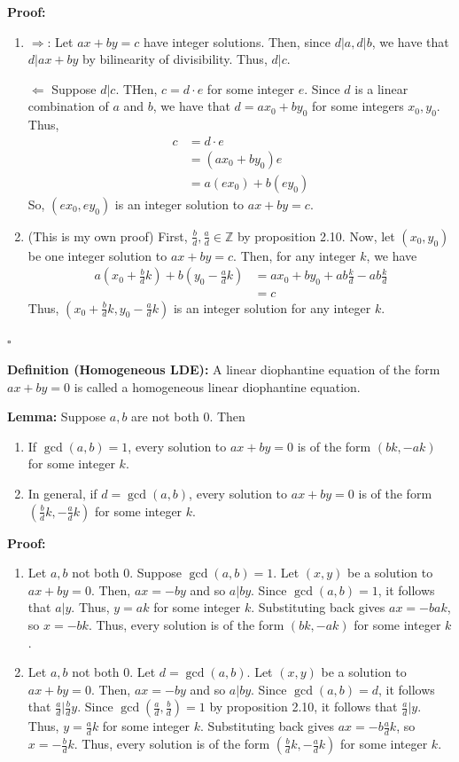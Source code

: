 \documentclass{article}
\newcommand*{\qed}{\hfill$\square$}%
\newcommand*{\zz}{\mathbb{Z}}%
\begin{document}
\textbf{Proof:} \begin{enumerate}[(1)]
    \item $\Rightarrow$: Let $ax+by=c$ have integer solutions. Then, since $d|a,d|b$, we have that $d|ax+by$ by bilinearity of divisibility. Thus, $d|c$.
    
    $\Leftarrow$ Suppose $d|c$. THen, $c=d\cdot e$ for some integer $e$. Since $d$ is a linear combination of $a$ and $b$, we have that $d = ax_0 + by_0$ for some integers $x_0,y_0$. Thus, \begin{align*}
        c &= d\cdot e \\
          &= (ax_0 + by_0)e \\
          &= a(ex_0) + b(ey_0)
    \end{align*}
    So, $(ex_0, ey_0)$ is an integer solution to $ax+by=c$.
    \item (This is my own proof) First, $\frac{b}{d}, \frac{a}{d}\in \zz$ by proposition 2.10. Now, let $(x_0,y_0)$ be one integer solution to $ax+by=c$. Then, for any integer $k$, we have \begin{align*}
        a(x_0 + \frac{b}{d}k) + b(y_0 - \frac{a}{d}k) &= ax_0 + by_0 + ab\frac{k}{d} - ab\frac{k}{d} \\
        &= c
    \end{align*}
    Thus, $(x_0 + \frac{b}{d}k, y_0 - \frac{a}{d}k)$ is an integer solution for any integer $k$.
\end{enumerate}\qed

\textbf{Definition (Homogeneous LDE):} A linear diophantine equation of the form $ax+by=0$ is called a homogeneous linear diophantine equation.

\textbf{Lemma:} Suppose $a,b$ are not both 0. Then \begin{enumerate}[(1)]
    \item If $\gcd(a,b)=1$, every solution to $ax+by=0$ is of the form $(bk, -ak)$ for some integer $k$.
    \item In general, if $d=\gcd(a,b)$, every solution to $ax+by=0$ is of the form $(\frac{b}{d}k, -\frac{a}{d}k)$ for some integer $k$.
\end{enumerate}

\textbf{Proof:} \begin{enumerate}[(1)]
    \item Let $a,b$ not both 0. Suppose $\gcd(a,b)=1$. Let $(x,y)$ be a solution to $ax+by=0$. Then, $ax=-by$ and so $a|by$. Since $\gcd(a,b)=1$, it follows that $a|y$. Thus, $y=ak$ for some integer $k$. Substituting back gives $ax=-bak$, so $x=-bk$. Thus, every solution is of the form $(bk, -ak)$ for some integer $k$.
    \item Let $a,b$ not both 0. Let $d=\gcd(a,b)$. Let $(x,y)$ be a solution to $ax+by=0$. Then, $ax=-by$ and so $a|by$. Since $\gcd(a,b)=d$, it follows that $\frac{a}{d}|\frac{b}{d}y$. Since $\gcd(\frac{a}{d}, \frac{b}{d})=1$ by proposition 2.10, it follows that $\frac{a}{d}|y$. Thus, $y=\frac{a}{d}k$ for some integer $k$. Substituting back gives $ax=-b\frac{a}{d}k$, so $x=-\frac{b}{d}k$. Thus, every solution is of the form $(\frac{b}{d}k, -\frac{a}{d}k)$ for some integer $k$.
\end{enumerate}
\end{document}
